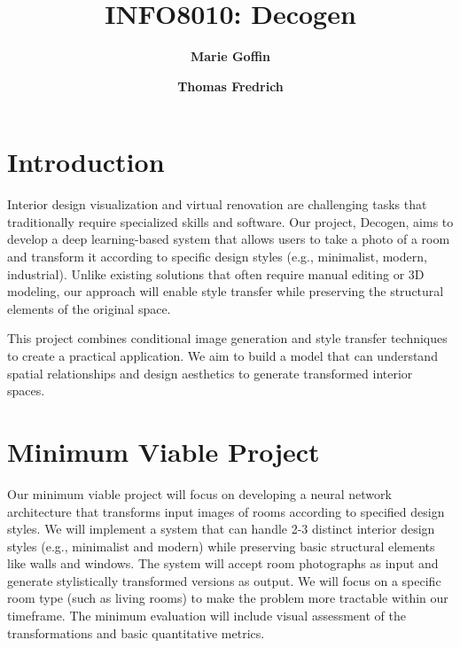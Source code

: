 \documentclass[twocolumn,superscriptaddress,aps]{revtex4-1}
\begin{document}

\title{\Large{INFO8010: Decogen}}
\vspace{1cm}
\author{\small{\bf Marie Goffin}}
\author{\small{\bf Thomas Fredrich}}

\maketitle


\section{Introduction}

Interior design visualization and virtual renovation are challenging tasks that traditionally require specialized skills and software. Our project, Decogen, aims to develop a deep learning-based system that allows users to take a photo of a room and transform it according to specific design styles (e.g., minimalist, modern, industrial). Unlike existing solutions that often require manual editing or 3D modeling, our approach will enable style transfer while preserving the structural elements of the original space.

This project combines conditional image generation and style transfer techniques to create a practical application. We aim to build a model that can understand spatial relationships and design aesthetics to generate transformed interior spaces.

\section{Minimum Viable Project}

Our minimum viable project will focus on developing a neural network architecture that transforms input images of rooms according to specified design styles. We will implement a system that can handle 2-3 distinct interior design styles (e.g., minimalist and modern) while preserving basic structural elements like walls and windows. The system will accept room photographs as input and generate stylistically transformed versions as output. We will focus on a specific room type (such as living rooms) to make the problem more tractable within our timeframe. The minimum evaluation will include visual assessment of the transformations and basic quantitative metrics.
\end{document}
